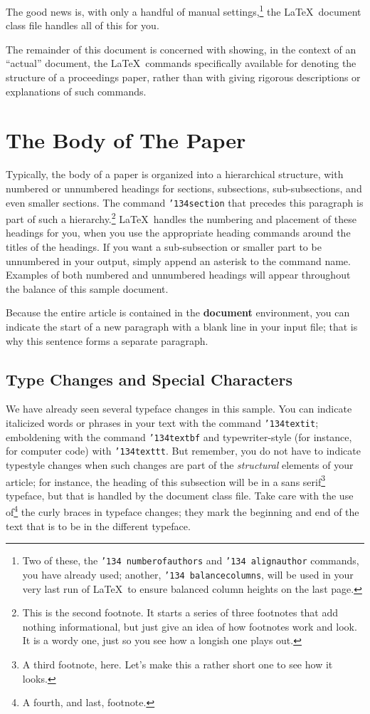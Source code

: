 \documentclass{style/nime-alternate}
\begin{document}
The good news is, with only a handful of manual
settings,\footnote{Two of these, the {\texttt{\char'134 numberofauthors}}
and {\texttt{\char'134 alignauthor}} commands, you have
already used; another, {\texttt{\char'134 balancecolumns}}, will
be used in your very last run of \LaTeX\ to ensure
balanced column heights on the last page.} the \LaTeX\ document
class file handles all of this for you.

The remainder of this document is concerned with showing, in
the context of an ``actual'' document, the \LaTeX\ commands
specifically available for denoting the structure of a
proceedings paper, rather than with giving rigorous descriptions
or explanations of such commands.

\section{The {\secit Body} of The Paper}
Typically, the body of a paper is organized
into a hierarchical structure, with numbered or unnumbered
headings for sections, subsections, sub-subsections, and even
smaller sections.  The command \texttt{{\char'134}section} that
precedes this paragraph is part of such a
hierarchy.\footnote{This is the second footnote.  It
starts a series of three footnotes that add nothing
informational, but just give an idea of how footnotes work
and look. It is a wordy one, just so you see
how a longish one plays out.} \LaTeX\ handles the numbering
and placement of these headings for you, when you use
the appropriate heading commands around the titles
of the headings.  If you want a sub-subsection or
smaller part to be unnumbered in your output, simply append an
asterisk to the command name.  Examples of both
numbered and unnumbered headings will appear throughout the
balance of this sample document.

Because the entire article is contained in
the \textbf{document} environment, you can indicate the
start of a new paragraph with a blank line in your
input file; that is why this sentence forms a separate paragraph.

\subsection{Type Changes and {\subsecit Special} Characters}
We have already seen several typeface changes in this sample.  You
can indicate italicized words or phrases in your text with
the command \texttt{{\char'134}textit}; emboldening with the
command \texttt{{\char'134}textbf}
and typewriter-style (for instance, for computer code) with
\texttt{{\char'134}texttt}.  But remember, you do not
have to indicate typestyle changes when such changes are
part of the \textit{structural} elements of your
article; for instance, the heading of this subsection will
be in a sans serif\footnote{A third footnote, here.
Let's make this a rather short one to
see how it looks.} typeface, but that is handled by the
document class file. Take care with the use
of\footnote{A fourth, and last, footnote.}
the curly braces in typeface changes; they mark
the beginning and end of
the text that is to be in the different typeface.
\end{document}
